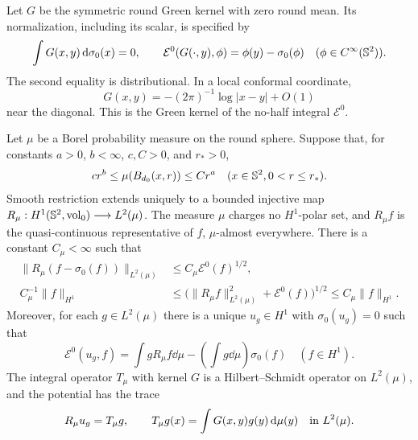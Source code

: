 Let $G$ be the symmetric round Green kernel with zero round mean.  Its
normalization, including its scalar, is specified by
\begin{equation}\label{eq:round-green-normalization}
 \int G(x,y)\,\mathrm d\sigma_0(x)=0,\qquad
 \mathcal E^0(G(\cdot,y),\phi)=\phi(y)-\sigma_0(\phi)
 \quad(\phi\in C^\infty(\mathbb S^2)).
\end{equation}
The second equality is distributional.  In a local conformal coordinate,
\[
 G(x,y)=-(2\pi)^{-1}\log|x-y|+O(1)
\]
near the diagonal.  This is the Green kernel of the no-half integral
$\mathcal E^0$.

\begin{lemma}\label{lem:trace-green}
Let $\mu$ be a Borel probability measure on the round sphere.  Suppose
that, for constants $a>0$, $b<\infty$, $c,C>0$, and $r_*>0$,
\begin{equation}\label{eq:deterministic-ball-bounds}
 c r^b\le\mu(B_{d_0}(x,r))\le C r^a
 \quad(x\in\mathbb S^2, 0<r\le r_*).
\end{equation}
Smooth restriction extends uniquely to a bounded injective map
$R_\mu:H^1(\mathbb S^2,\mathrm{vol}_0)\longrightarrow L^2(\mu)$.
The measure $\mu$ charges no $H^1$-polar set, and $R_\mu f$ is the
quasi-continuous representative of $f$, $\mu$-almost everywhere.  There
is a constant $C_\mu<\infty$ such that
\begin{align}
 \|R_\mu(f-\sigma_0(f))\|_{L^2(\mu)}
       &\le C_\mu\mathcal E^0(f)^{1/2},\label{eq:centered-trace}\\
 C_\mu^{-1}\|f\|_{H^1}
       &\le \bigl(\|R_\mu f\|_{L^2(\mu)}^2+\mathcal E^0(f)\bigr)^{1/2}
       \le C_\mu\|f\|_{H^1}.\label{eq:trace-norm-equivalence}
\end{align}
Moreover, for each $g\in L^2(\mu)$ there is a unique $u_g\in H^1$ with
$\sigma_0(u_g)=0$ such that
\begin{equation}\label{eq:potential-weak-equation}
 \mathcal E^0(u_g,f)=\int g R_\mu f\dd\mu
               -\left(\int g\dd\mu\right)\sigma_0(f)
 \quad(f\in H^1).
\end{equation}
The integral operator $T_\mu$ with kernel $G$ is a Hilbert--Schmidt
operator on $L^2(\mu)$, and the potential has the trace
\begin{equation}\label{eq:potential-trace}
 R_\mu u_g=T_\mu g,\qquad
 T_\mu g(x)=\int G(x,y)g(y)\,\mathrm d\mu(y)
 \quad\hbox{in }L^2(\mu).
\end{equation}
\end{lemma}

